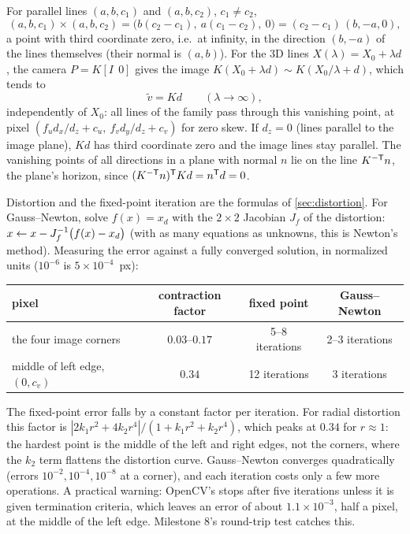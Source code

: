\begin{solutions}
  \item For parallel lines $(a, b, c_1)$ and $(a, b, c_2)$, $c_1 \ne c_2$,
        \[
          (a, b, c_1)\times(a, b, c_2) = \big(b(c_2 - c_1),\ a(c_1 - c_2),\ 0\big) = (c_2 - c_1)\,(b, -a, 0),
        \]
        a point with third coordinate zero, i.e.\ at infinity, in the direction $(b, -a)$ of the lines themselves (their normal is $(a, b)$). For the 3D lines
        $X(\lambda) = X_0 + \lambda d$, the camera $P = K[I\ \ 0]$ gives the image $K(X_0 + \lambda d) \sim K(X_0/\lambda + d)$, which tends to
        \[
          \tilde v = Kd \qquad (\lambda\to\infty),
        \]
        independently of $X_0$: all lines of the family pass through this vanishing point, at pixel $(f_ud_x/d_z + c_u,\ f_vd_y/d_z + c_v)$ for zero skew. If $d_z = 0$ (lines
        parallel to the image plane), $Kd$ has third coordinate zero and the image lines stay parallel. The vanishing points of all directions in a plane with
        normal $n$ lie on the line $K^{-\mathsf{T}} n$, the plane's horizon, since $(K^{-\mathsf{T}} n)^{\mathsf{T}} Kd = n^{\mathsf{T}} d = 0$.

  \item Distortion and the fixed-point iteration are the formulas of \cref{sec:distortion}. For Gauss--Newton,
        solve $f(x) = x_d$ with the $2\times2$ Jacobian $J_f$ of the distortion: $x \gets x - J_f^{-1}\big(f(x) - x_d\big)$ (with as many equations as unknowns, this is
        Newton's method). Measuring the error against a fully converged solution, in normalized units ($10^{-6}$ is $5\times10^{-4}$~px):
        \begin{center}\small
        \begin{tabular}{@{}l c c c@{}}
        \toprule
        pixel & contraction factor & fixed point & Gauss--Newton \\
        \midrule
        the four image corners & $0.03$--$0.17$ & 5--8 iterations & 2--3 iterations \\
        middle of left edge, $(0, c_v)$ & $0.34$ & 12 iterations & 3 iterations \\
        \bottomrule
        \end{tabular}
        \end{center}
        The fixed-point error falls by a constant factor per iteration. For radial distortion this factor is $|2k_1r^2 + 4k_2r^4|/(1 + k_1r^2 + k_2r^4)$, which peaks at
        $0.34$ for $r \approx 1$: the hardest point is the middle of the left and right edges, not the corners, where the $k_2$ term flattens the
        distortion curve. Gauss--Newton converges quadratically (errors $10^{-2}, 10^{-4}, 10^{-8}$ at a corner), and each iteration costs only a few more
        operations. A practical warning: OpenCV's  stops after five iterations unless it is given termination criteria, which
        leaves an error of about $1.1\times10^{-3}$, half a pixel, at the middle of the left edge. Milestone 8's round-trip test catches this.


\end{solutions}
